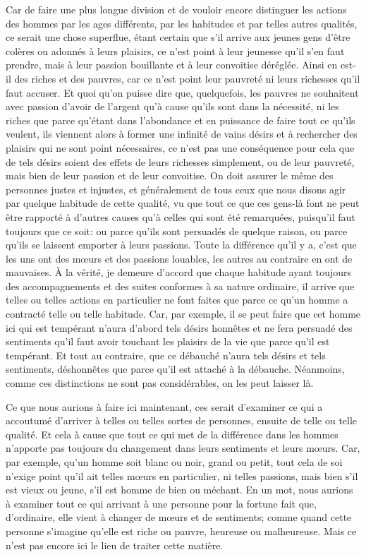 Car de faire une plus longue division et de vouloir encore distinguer les actions des hommes par les ages différents,
par les habitudes et par telles autres qualités, ce serait une chose superflue, étant certain que s'il arrive aux
jeunes gens d'être colères ou adonnés à leurs plaisirs, ce n'est point à leur jeunesse qu'il s'en faut prendre, mais
à leur passion bouillante et à leur convoitise déréglée. Ainsi en est-il des riches et des pauvres, car ce n'est point
leur pauvreté ni leurs richesses qu'il faut accuser. Et quoi qu'on puisse dire que, quelquefois, les pauvres ne souhaitent
avec passion d'avoir de l'argent qu'à cause qu'ils sont dans la nécessité, ni les riches que parce qu'étant dans l'abondance
et en puissance de faire tout ce qu'ils veulent, ils viennent alors à former une infinité de vains désirs et à rechercher
des plaisirs qui ne sont point nécessaires, ce n'est pas une conséquence pour cela que de tels désirs soient des effets
de leurs richesses simplement, ou de leur pauvreté, mais bien de leur passion et de leur convoitise. On doit assurer le
même des personnes justes et injustes, et généralement de tous ceux que nous disons agir par quelque habitude de cette
qualité, vu que tout ce que ces gens-là font ne peut être rapporté à d'autres causes qu'à celles qui sont été remarquées,
puisqu'il faut toujours que ce soit: ou parce qu'ils sont persuadés de quelque raison, ou parce qu'ils se laissent emporter
à leurs passions. Toute la différence qu'il y a, c'est que les uns ont des mœurs et des passions louables, les autres au
contraire en ont de mauvaises. À la vérité, je demeure d'accord que chaque habitude ayant toujours des accompagnements et
des suites conformes à sa nature ordinaire, il arrive que telles ou telles actions en particulier ne font faites que parce
ce qu'un homme a contracté telle ou telle habitude. Car, par exemple, il se peut faire que cet homme ici qui est tempérant
n'aura d'abord tels désirs honnêtes et ne fera persuadé des sentiments qu'il faut avoir touchant les plaisirs de la vie
que parce qu'il est tempérant. Et tout au contraire, que ce débauché n'aura tels désirs et tels sentiments, déshonnêtes que
parce qu'il est attaché à la débauche. Néanmoins, comme ces distinctions ne sont pas considérables, on les peut laisser là.

\bigbreak

Ce que nous aurions à faire ici maintenant, ces serait d'examiner ce qui a accoutumé d'arriver à telles ou telles sortes de
personnes, ensuite de telle ou telle qualité. Et cela à cause que tout ce qui met de la différence dans les hommes n'apporte
pas toujours du changement dans leurs sentiments et leurs mœurs. Car, par exemple, qu'un homme soit blanc ou noir, grand ou
petit, tout cela de soi n'exige point qu'il ait telles mœurs en particulier, ni telles passions, mais bien s'il est vieux ou
jeune, s'il est homme de bien ou méchant. En un mot, nous aurions à examiner tout ce qui arrivant à une personne pour la fortune
fait que, d'ordinaire, elle vient à changer de mœurs et de sentiments; comme quand cette personne s'imagine qu'elle est riche ou
pauvre, heureuse ou malheureuse. Mais ce n'est pas encore ici le lieu de traiter cette matière. 

